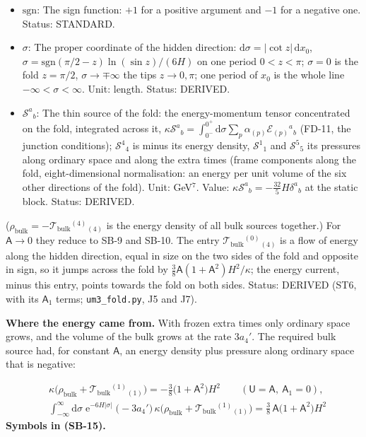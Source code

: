\documentclass[
  10pt,
]{article}
\begin{document}
\begin{itemize}
  (\(x_5, x_6, x_7\)); not summed (the three components are equal).
  Status: STANDARD.
\item
  \(\mathrm{sgn}\): The sign function: \(+1\) for a positive argument
  and \(-1\) for a negative one. Status: STANDARD.
\item
  \(\sigma\): The proper coordinate of the hidden direction:
  \(\mathrm{d}\sigma = \lvert\cot z\rvert\,\mathrm{d}x_0\),
  \(\sigma = \mathrm{sgn}(\pi/2 - z)\ln(\sin z)/(6H)\) on one period
  \(0 < z < \pi\); \(\sigma = 0\) is the fold \(z = \pi/2\),
  \(\sigma \to \mp\infty\) the tips \(z \to 0, \pi\); one period of
  \(x_0\) is the whole line \(-\infty < \sigma < \infty\). Unit: length.
  Status: DERIVED.
\item
  \(\mathcal{S}^a{}_b\): The thin source of the fold: the
  energy-momentum tensor concentrated on the fold, integrated across it,
  \(\kappa\mathcal{S}^a{}_b = \int_{0^-}^{0^+}\mathrm{d}\sigma\sum_p\alpha_{(p)}\mathcal{E}_{(p)}{}^a{}_b\)
  (FD-11, the junction conditions); \(\mathcal{S}^4{}_4\) is minus its
  energy density, \(\mathcal{S}^1{}_1\) and \(\mathcal{S}^5{}_5\) its
  pressures along ordinary space and along the extra times (frame
  components along the fold, eight-dimensional normalisation: an energy
  per unit volume of the six other directions of the fold). Unit:
  GeV\(^7\). Value:
  \(\kappa\mathcal{S}^a{}_b = -\frac{32}{5}H\delta^a{}_b\) at the static
  block. Status: DERIVED.
\end{itemize}

(\(\rho_{\mathrm{bulk}} = -\mathcal{T}_{\mathrm{bulk}}{}^{(4)}{}_{(4)}\)
is the energy density of all bulk sources together.) For
\(\mathsf{A} \to 0\) they reduce to SB-9 and SB-10. The entry
\(\mathcal{T}_{\mathrm{bulk}}{}^{(0)}{}_{(4)}\) is a flow of energy
along the hidden direction, equal in size on the two sides of the fold
and opposite in sign, so it jumps across the fold by
\(\frac38\mathsf{A}(1 + \mathsf{A}^2)H^2/\kappa\); the energy current,
minus this entry, points towards the fold on both sides. Status: DERIVED
(ST6, with its \(\mathsf{A}_1\) terms; \texttt{um3\_fold.py}, J5 and
J7).

\textbf{Where the energy came from.} With frozen extra times only
ordinary space grows, and the volume of the bulk grows at the rate
\(3a_4'\). The required bulk source had, for constant \(\mathsf{A}\), an
energy density plus pressure along ordinary space that is negative:

\[
\begin{aligned}
&\kappa\big(\rho_{\mathrm{bulk}} + \mathcal{T}_{\mathrm{bulk}}{}^{(1)}{}_{(1)}\big) = -\frac{3}{8}\big(1 + \mathsf{A}^2\big)H^2\qquad
 (\mathsf{U} = \mathsf{A},\ \mathsf{A}_1 = 0),\\
&\int_{-\infty}^{\infty}\mathrm{d}\sigma\;\mathrm{e}^{-6H\lvert\sigma\rvert}\;\big(-3a_4'\big)\,\kappa\big(\rho_{\mathrm{bulk}}
 + \mathcal{T}_{\mathrm{bulk}}{}^{(1)}{}_{(1)}\big) = \frac{3}{8}\,\mathsf{A}\big(1 + \mathsf{A}^2\big)H^2
\end{aligned} \tag{SB-15}
\] \textbf{Symbols in (SB-15).}
\end{document}

